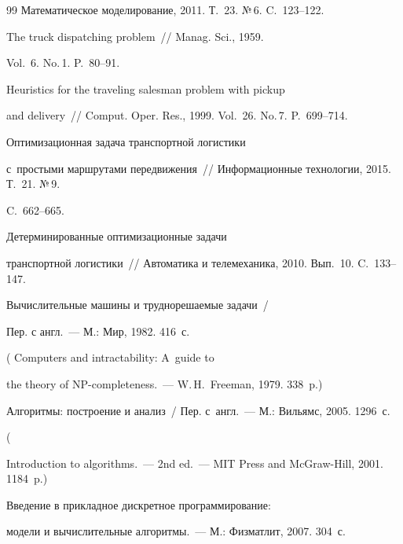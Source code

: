 {{\begin{thebibliography}{99}
Математическое моделирование, 2011. Т.~23. №\,6. C.~123--122.






The truck dispatching problem~/\!\!/ Manag. Sci., 1959. 


Vol.~6. No.\,1. P.~80--91.






Heuristics for the traveling salesman problem with pickup 


and delivery~/\!\!/ Comput. Oper. Res., 1999. Vol.~26. No.\,7. P.~699--714.




 Оптимизационная задача транспортной логистики 


с~простыми маршрутами передвижения~/\!\!/ Информационные технологии, 2015. Т.~21. №\,9. 


C.~662--665. 




 Детерминированные оптимизационные задачи 


транспортной логистики~/\!\!/ Автоматика и телемеханика, 2010. Вып.~10. C.~133--147.




 Вычислительные машины и труднорешаемые задачи~/ 


Пер. с англ.~--- М.: Мир, 1982. 416~с. 


( Computers and intractability: A~guide to 


the theory of NP-completeness.~---  W.\,H.~Freeman, 1979. 338~p.)









Алгоритмы: построение и анализ~/ Пер. с~англ.~--- М.: Вильямс, 2005. 1296~с. 


(


Introduction to algorithms.~--- 2nd ed.~--- MIT Press and McGraw-Hill, 2001. 1184~p.)




 Введение в прикладное дискретное программирование: 


модели и вычислительные алгоритмы.~--- М.: Физматлит, 2007. 304~с.


        \end{thebibliography}


} }








